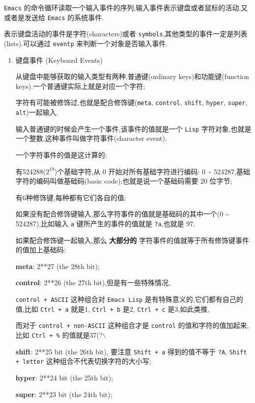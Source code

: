 \documentclass[11pt]{article}
\begin{document}
\texttt{Emacs} 的命令循环读取一个输入事件的序列,输入事件表示键盘或者鼠标的活动,又或者是发送给 \texttt{Emacs} 的系统事件.

表示键盘活动的事件是字符(characters)或者 \texttt{symbols},其他类型的事件一定是列表(lists).可以通过 \texttt{eventp} 来判断一个对象是否输入事件.


\begin{enumerate}
\item 键盘事件 (Keyboard Events)
\label{sec:org60a7b6e}

从键盘中能够获取的输入类型有两种,普通键(ordinary keys)和功能键(function keys).一个普通键实际上就是对应一个字符;

字符有可能被修饰过,也就是配合修饰键(\texttt{meta}, \texttt{control}, \texttt{shift}, \texttt{hyper}, \texttt{super}, \texttt{alt})一起输入.

输入普通键的时候会产生一个事件,该事件的值就是一个 \texttt{Lisp} 字符对象,也就是一个整数,这种事件叫做字符事件(character event).

一个字符事件的值是这计算的:

有524288(\(2^{19}\))个基础字符,从 0 开始对所有基础字符进行编码: 0 \textasciitilde{} 524287,基础字符的编码叫做基础码(basic code),也就是说一个基础码需要 20 位字节;

有6种修饰键,每种都有它们各自的值;

如果没有配合修饰键输入,那么字符事件的值就是基础码的其中一个(0 \textasciitilde{} 524287),比如输入 \texttt{a} 键所产生的事件的值就是 \texttt{?a},也就是 97.

如果配合修饰键一起输入,那么 \textbf{大部分的} 字符事件的值就等于所有修饰键事件的值加上基础码:

\textbf{meta}: 2**27 (the 28th bit);

\textbf{control}: 2**26 (the 27th bit),但是有一些特殊情况,

\texttt{control + ASCII} 这种组合对 \texttt{Emacs Lisp} 是有特殊意义的,它们都有自己的值,比如 \texttt{Ctrl + a} 就是1, \texttt{Ctrl + b} 是2, \texttt{Ctrl + c} 是3,如此类推,

而对于 \texttt{control + non-ASCII} 这种组合才是 \texttt{control} 的值和字符的值加起来,比如 \texttt{Ctrl + \%} 的值就是37(?$\backslash$%

\textbf{shift}: 2**25 bit (the 26th bit), 要注意 \texttt{Shift + a} 得到的值不等于 \texttt{?A}, \texttt{Shift + letter} 这种组合不代表切换字符的大小写;

\textbf{hyper}: 2**24 bit (the 25th bit);

\textbf{super}: 2**23 bit (the 24th bit);


\end{enumerate}
\end{document}

